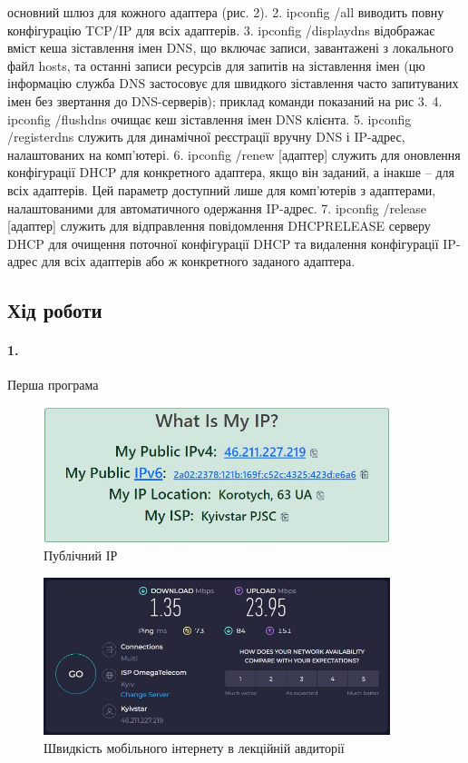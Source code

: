 \documentclass[12pt]{extarticle}
\begin{document}
основний шлюз для кожного адаптера (рис. 2).
2. ipconfig /all виводить повну конфігурацію TCP/IP для всіх адаптерів.
3. ipconfig /displaydns відображає вміст кеша зіставлення імен DNS, що включає
записи, завантажені з локального файл hosts, та останні записи ресурсів для запитів
на зіставлення імен (цю інформацію служба DNS застосовує для швидкого
зіставлення часто запитуваних імен без звертання до DNS-серверів); приклад
команди показаний на рис 3.
4. ipconfig /flushdns очищає кеш зіставлення імен DNS клієнта.
5. ipconfig /registerdns служить для динамічної реєстрації вручну DNS і IP-адрес,
налаштованих на комп’ютері.
6. ipconfig /renew [адаптер] служить для оновлення конфігурації DHCP для
конкретного адаптера, якщо він заданий, а інакше – для всіх адаптерів. Цей
параметр доступний лише для комп’ютерів з адаптерами, налаштованими для
автоматичного одержання IP-адрес.
7. ipconfig /release [адаптер] служить для відправлення повідомлення DHCPRELEASE
серверу DHCP для очищення поточної конфігурації DHCP та видалення
конфігурації IP-адрес для всіх адаптерів або ж конкретного заданого адаптера.

\break
\subsection*{Хід роботи}
\paragraph{1.}Перша програма

\vspace{12pt}
\begin{figure}[H]
    \centering
    \includegraphics[width=0.90\textwidth]{myip.jpg}
    \caption{Публічний ІР}
\end{figure}


\begin{figure}[H]
    \centering
    \includegraphics[width=0.90\textwidth]{speedtest.jpg}
    \caption{Швидкість мобільного інтернету в лекційній авдиторії}
\end{figure}
\end{document}
